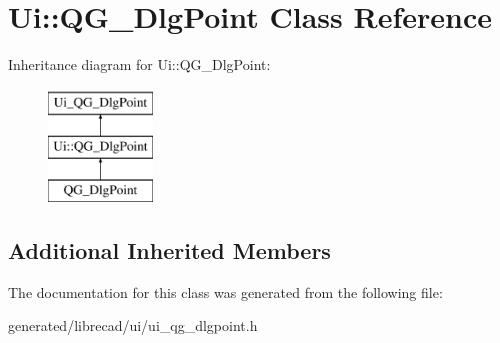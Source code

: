 \hypertarget{classUi_1_1QG__DlgPoint}{\section{Ui\-:\-:Q\-G\-\_\-\-Dlg\-Point Class Reference}
\label{classUi_1_1QG__DlgPoint}
}
Inheritance diagram for Ui\-:\-:Q\-G\-\_\-\-Dlg\-Point\-:\begin{figure}[H]
\begin{center}
\leavevmode
\includegraphics[height=3.000000cm]{classUi_1_1QG__DlgPoint}
\end{center}
\end{figure}
\subsection*{Additional Inherited Members}


The documentation for this class was generated from the following file\-:\begin{DoxyCompactItemize}
\item 
generated/librecad/ui/ui\-\_\-qg\-\_\-dlgpoint.\-h\end{DoxyCompactItemize}
